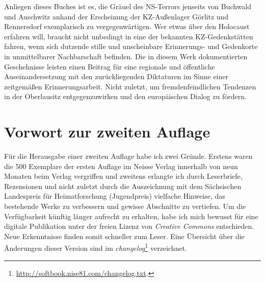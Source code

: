 \documentclass[a4paper,12pt,ngerman,
]{nisebook}
\begin{document}
Anliegen dieses Buches ist es, die Gräuel des NS-Terrors jenseits von Buchwald und Auschwitz anhand der Erscheinung der KZ-Außenlager Görlitz und Rennersdorf exemplarisch zu vergegenwärtigen. Wer etwas über den Holocaust erfahren will, braucht nicht unbedingt in eine der bekannten KZ-Gedenkstätten fahren, wenn sich dutzende stille und unscheinbare Erinnerungs- und Gedenkorte in unmittelbarer Nachbarschaft befinden. Die in diesem Werk dokumentierten Geschehnisse leisten einen Beitrag für eine regionale und öffentliche Auseinandersetzung mit den zurückliegenden Diktaturen im Sinne einer zeitgemäßen Erinnerungsarbeit. Nicht zuletzt, um fremdenfeindlichen Tendenzen in der Oberlausitz entgegenzuwirken und den europäischen Dialog zu fördern.

\section*{Vorwort zur zweiten Auflage}
Für die Herausgabe einer zweiten Auflage habe ich zwei Gründe. Erstens waren die 500 Exemplare der ersten Auflage im Neisse Verlag innerhalb von neun Monaten beim Verlag vergriffen und zweitens erlangte ich durch Leserbriefe, Rezensionen und nicht zuletzt durch die Auszeichnung mit dem Sächsischen Landespreis für Heimatforschung (Jugendpreis) vielfache Hinweise, das bestehende Werke zu verbessern und gewisse Abschnitte zu vertiefen.
Um die Verfügbarkeit künftig länger aufrecht zu erhalten, habe ich mich bewusst für eine digitale Publikation unter der freien Lizenz von \emph{Creative Commons} entschieden. Neue Erkenntnisse finden somit schneller zum Leser. 
Eine Übersicht über die Änderungen dieser Version sind im \emph{changelog}\footnote{\url{http://softbook.nise81.com/changelog.txt}.} verzeichnet. 
\end{document}
